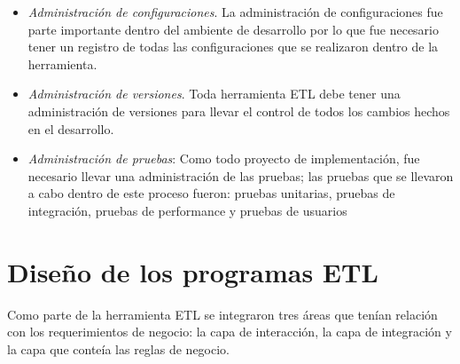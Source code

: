 \begin{itemize}
\item \textit{Administración de configuraciones}. La administración de
  configuraciones fue parte importante dentro del ambiente de desarrollo por lo
  que fue necesario tener un registro de todas las configuraciones que se
  realizaron dentro de la herramienta.

\item \textit{Administración de versiones}. Toda herramienta ETL debe tener una
  administración de versiones para llevar el control de todos los cambios hechos
  en el desarrollo.

\item \textit{Administración de pruebas}: Como todo proyecto de implementación,
  fue necesario llevar una administración de las pruebas; las pruebas que se
  llevaron a cabo dentro de este proceso fueron: pruebas unitarias, pruebas de
  integración, pruebas de performance y pruebas de usuarios

\end{itemize}

\section{Diseño de los programas ETL}

Como parte de la herramienta ETL se integraron tres áreas que tenían relación
con los requerimientos de negocio: la capa de interacción, la capa de
integración y la capa que conteía las reglas de negocio.

